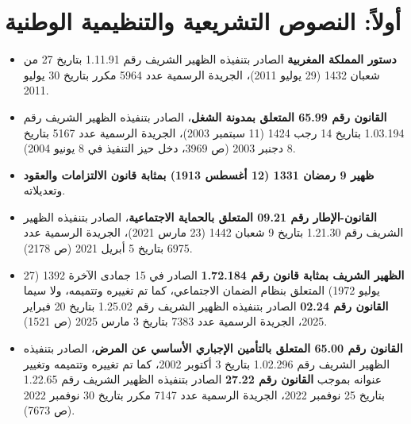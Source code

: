 \section*{أولاً: النصوص التشريعية والتنظيمية الوطنية}
\begin{itemize}[leftmargin=*, itemsep=5pt]
    \item \textbf{دستور المملكة المغربية} الصادر بتنفيذه الظهير الشريف رقم \textenglish{1.11.91} بتاريخ \textenglish{27} من شعبان \textenglish{1432} (\textenglish{29} يوليو \textenglish{2011})، الجريدة الرسمية عدد \textenglish{5964} مكرر بتاريخ \textenglish{30} يوليو \textenglish{2011}.
    \item \textbf{القانون رقم \textenglish{65.99} المتعلق بمدونة الشغل}، الصادر بتنفيذه الظهير الشريف رقم \textenglish{1.03.194} بتاريخ \textenglish{14} رجب \textenglish{1424} (\textenglish{11} سبتمبر \textenglish{2003})، الجريدة الرسمية عدد \textenglish{5167} بتاريخ \textenglish{8} دجنبر \textenglish{2003} (ص \textenglish{3969}، دخل حيز التنفيذ في \textenglish{8} يونيو \textenglish{2004}).
    \item \textbf{ظهير \textenglish{9} رمضان \textenglish{1331} (\textenglish{12} أغسطس \textenglish{1913}) بمثابة قانون الالتزامات والعقود} وتعديلاته.
    \item \textbf{القانون-الإطار رقم \textenglish{09.21} المتعلق بالحماية الاجتماعية}، الصادر بتنفيذه الظهير الشريف رقم \textenglish{1.21.30} بتاريخ \textenglish{9} شعبان \textenglish{1442} (\textenglish{23} مارس \textenglish{2021})، الجريدة الرسمية عدد \textenglish{6975} بتاريخ \textenglish{5} أبريل \textenglish{2021} (ص \textenglish{2178}).
    \item \textbf{الظهير الشريف بمثابة قانون رقم \textenglish{1.72.184}} الصادر في \textenglish{15} جمادى الآخرة \textenglish{1392} (\textenglish{27} يوليو \textenglish{1972}) المتعلق بنظام الضمان الاجتماعي، كما تم تغييره وتتميمه، ولا سيما \textbf{القانون رقم \textenglish{02.24}} الصادر بتنفيذه الظهير الشريف رقم \textenglish{1.25.02} بتاريخ \textenglish{20} فبراير \textenglish{2025}، الجريدة الرسمية عدد \textenglish{7383} بتاريخ \textenglish{3} مارس \textenglish{2025} (ص \textenglish{1521}).
    \item \textbf{القانون رقم \textenglish{65.00} المتعلق بالتأمين الإجباري الأساسي عن المرض}، الصادر بتنفيذه الظهير الشريف رقم \textenglish{1.02.296} بتاريخ \textenglish{3} أكتوبر \textenglish{2002}، كما تم تغييره وتتميمه وتغيير عنوانه بموجب \textbf{القانون رقم \textenglish{27.22}} الصادر بتنفيذه الظهير الشريف رقم \textenglish{1.22.65} بتاريخ \textenglish{25} نوفمبر \textenglish{2022}، الجريدة الرسمية عدد \textenglish{7147} مكرر بتاريخ \textenglish{30} نوفمبر \textenglish{2022} (ص \textenglish{7673}).

\end{itemize}
